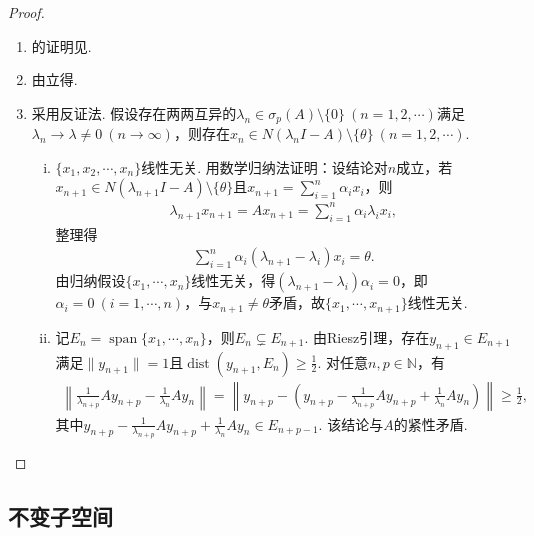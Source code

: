 \documentclass[../../main.tex]{subfiles}%
\begin{document}
\begin{proof}
\begin{enumerate}[(1)]
\item 的证明见.

\item 由立得.

\item 采用反证法.
假设存在两两互异的$\lambda_n\in\sigma_p(A)\setminus\{0\}\ (n=1,2,\cdots)$满足$\lambda_n\to\lambda\neq0\ (n\to\infty)$，则存在$x_n\in N(\lambda_n I-A)\setminus\{\theta\}\ (n=1,2,\cdots)$.
\begin{enumerate}[(i)]
\item $\{x_1,x_2,\cdots,x_n\}$线性无关.
用数学归纳法证明：设结论对$n$成立，若$x_{n+1}\in N(\lambda_{n+1}I-A)\setminus\{\theta\}$且$x_{n+1}=\sum\limits_{i=1}^n\alpha_i x_i$，则
\begin{align*}
\lambda_{n+1}x_{n+1}=Ax_{n+1}=\sum\limits_{i=1}^n\alpha_i\lambda_i x_i,
\end{align*}
整理得
\begin{align*}
\sum\limits_{i=1}^n\alpha_i(\lambda_{n+1}-\lambda_i)x_i=\theta.
\end{align*}
由归纳假设$\{x_1,\cdots,x_n\}$线性无关，得$(\lambda_{n+1}-\lambda_i)\alpha_i=0$，即$\alpha_i=0\ (i=1,\cdots,n)$，与$x_{n+1}\neq\theta$矛盾，故$\{x_1,\cdots,x_{n+1}\}$线性无关.

\item 记$E_n=\operatorname{span}\{x_1,\cdots,x_n\}$，则$E_n\subsetneq E_{n+1}$.
由Riesz引理，存在$y_{n+1}\in E_{n+1}$满足$\|y_{n+1}\|=1$且$\operatorname{dist}(y_{n+1},E_n)\geqslant\frac12$.
对任意$n,p\in\mathbb{N}$，有
\begin{align*}
\left\|\frac{1}{\lambda_{n+p}}Ay_{n+p}-\frac{1}{\lambda_n}Ay_n\right\|
=\left\|y_{n+p}-\left(y_{n+p}-\frac{1}{\lambda_{n+p}}Ay_{n+p}+\frac{1}{\lambda_n}Ay_n\right)\right\|
\geqslant\frac12,
\end{align*}
其中$y_{n+p}-\frac{1}{\lambda_{n+p}}Ay_{n+p}+\frac{1}{\lambda_n}Ay_n\in E_{n+p-1}$.
该结论与$A$的紧性矛盾.
\end{enumerate}
\end{enumerate}

\end{proof}

\subsection{不变子空间}
\end{document}

